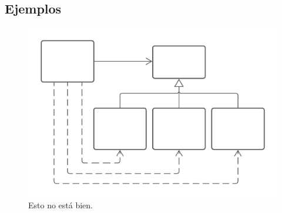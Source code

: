 \documentclass[a4paper,11pt]{article}
\begin{document}
  


\subsection{Ejemplos}
\begin{figure}[!h]
    \centering
    \includegraphics[scale=.7]{assets/ec1.png}
    \caption{Esto no está bien.}
\end{figure}
\end{document}
